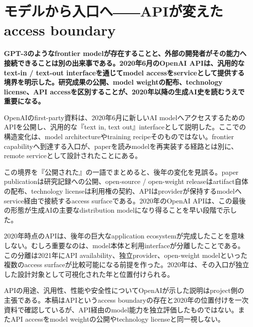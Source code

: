 \section{モデルから入口へ――APIが変えたaccess boundary}
\noindent\textbf{GPT-3のようなfrontier modelが存在することと、外部の開発者がその能力へ接続できることは別の出来事である。2020年6月のOpenAI APIは、汎用的なtext-in / text-out interfaceを通じてmodel accessをserviceとして提供する境界を明示した。研究成果の公開、model weightの配布、technology license、API accessを区別することが、2020年以降の生成AI史を読むうえで重要になる。}\autocite{src-3b6a4c260e20}

OpenAIのfirst-party資料は、2020年6月に新しいAI modelへアクセスするためのAPIを公開し、汎用的な『text in, text out』interfaceとして説明した。ここでの構造変化は、model architectureやtraining recipeそのものではない。frontier capabilityへ到達する入口が、paperを読みmodelを再実装する経路とは別に、remote serviceとして設計されたことにある。\autocite{src-3b6a4c260e20}


この境界を『公開された』の一語でまとめると、後年の変化を見誤る。paper publicationは研究記録への公開、open-source / open-weight releaseはartifact自体の配布、technology licenseは利用権の契約、APIはproviderが保持するmodelへservice経由で接続するaccess surfaceである。2020年のOpenAI APIは、この最後の形態が生成AIの主要なdistribution modelになり得ることを早い段階で示した。\autocite{src-3b6a4c260e20}


2020年時点のAPIは、後年の巨大なapplication ecosystemが完成したことを意味しない。むしろ重要なのは、model本体と利用interfaceが分離したことである。この分離は2021年にAPI availability、独立provider、open-weight modelといった複数のaccess surfaceが比較可能になる前提を作った。2020年は、その入口が独立した設計対象として可視化された年と位置付けられる。\autocite{src-3b6a4c260e20}


\begin{claimboundary}
APIの用途、汎用性、性能や安全性についてOpenAIが示した説明はproject側の主張である。本稿はAPIというaccess boundaryの存在と2020年の位置付けを一次資料で確認しているが、API経由のmodel能力を独立評価したものではない。またAPI accessをmodel weightの公開やtechnology licenseと同一視しない。\autocite{src-3b6a4c260e20}
\end{claimboundary}
